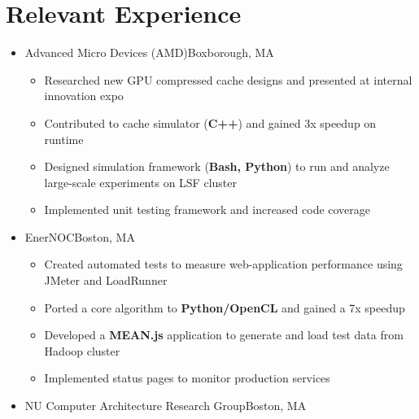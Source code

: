 \documentclass[11pt,letterpaper,sans]{moderncv}
\begin{document}
\section{Relevant Experience}

\vspace{6pt}

\begin{itemize}


\item[] {
{Advanced Micro Devices (AMD)}{Boxborough, MA}{}{\vspace{3pt}}
\vspace{-3mm}	\begin{itemize}
	 \item Researched new GPU compressed cache designs and presented at internal innovation expo
	 \item Contributed to cache simulator (\textbf{C++}) and gained 3x speedup on runtime
	 \item Designed simulation framework (\textbf{Bash, Python}) to run and analyze large-scale experiments on LSF cluster
	 \item Implemented unit testing framework and increased code coverage
	\end{itemize}
}
\vspace{6pt}

\item[] {
{EnerNOC}{Boston, MA}{}{\vspace{3pt}}
\vspace{-3mm}	\begin{itemize}
	 \item Created automated tests to measure 
web-application performance using JMeter and LoadRunner
	 \item Ported a core algorithm to \textbf{Python/OpenCL} and gained a 7x speedup
	 \item Developed a \textbf{MEAN.js} application to generate and load test data from Hadoop cluster
	 \item Implemented status pages to monitor production services

	\end{itemize}
}
\vspace{6pt}


\item[] {
{NU Computer Architecture Research Group}{Boston, MA}{}{\vspace{3pt}}
\vspace{-3mm}	\begin{itemize}
	

\end{itemize}}
\end{itemize}
\end{document}
